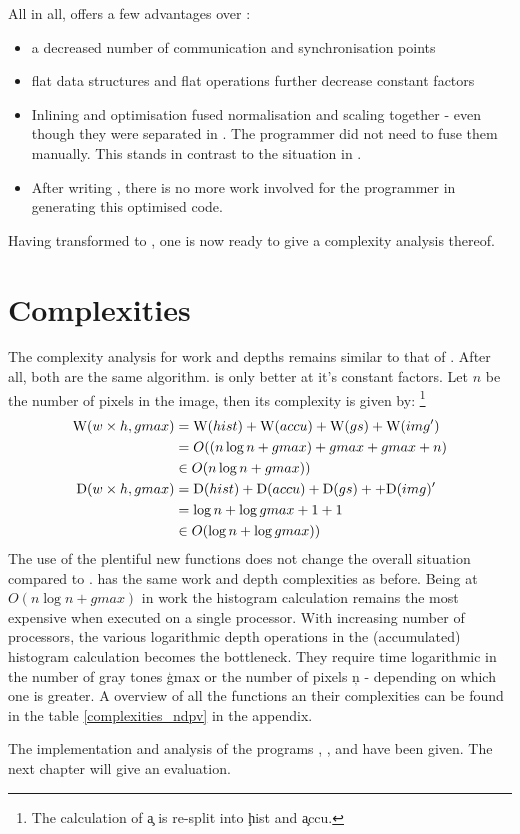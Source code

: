   All in all, \ndpv offers a few advantages over \ndpn:
  \begin{itemize}
    \item a decreased number of communication and synchronisation points
    \item flat data structures and flat operations further decrease constant factors
    \item Inlining and optimisation fused
          normalisation and scaling together - even though
          they were separated in \ndpn. The programmer did not
          need to fuse them manually. This stands in contrast to the situation in \man.
    \item After writing \ndpn, there is no more work involved for the programmer in generating this optimised code.
  \end{itemize}
  Having transformed \ndpn to \ndpv,
  one is now ready to give a complexity analysis thereof.
  
\section{Complexities}
  The complexity analysis for work and depths remains similar to that of \ndpn.
  After all, both are the same algorithm. \ndpv is only better at it's constant factors.
  Let $n$ be the number of pixels in the image,
  then its complexity is given by:
  \footnote{
  The calculation of \c{a} is re-split into \c{hist} and \c{accu}.
  }
  \begin{equation*}
  \begin{split}
  \W(w \times h,gmax)
        & = \W(hist) + \W(accu) + \W(gs) + \comment{\W(expandPS) +} \W(img') \\
        & = O( (n \log n + gmax) + gmax + gmax \comment{ + 1} + n) \\
        & \in O(n \log n + gmax)) \\
  \D(w \times h,gmax)
      & = \D(hist) + \D(accu) + \D(gs) + \comment{+ \D(expandPS)} + \D(img)' \\
      & = \log n + \log gmax + 1 + 1  \\
      & \in O(\log n + \log gmax)) \\
  \end{split}
  \end{equation*}
  The use of the plentiful new functions does not change the overall situation compared to \ndpn.
  \ndpv has the same work and depth complexities as before.
  Being at $O(n \log n + gmax)$ in work
  the histogram calculation remains the most expensive when executed on a single processor.
  With increasing number of processors, the various logarithmic depth
  operations in the (accumulated) histogram calculation becomes the bottleneck.
  They require time logarithmic in the number of gray tones \c{gmax} or the number
  of pixels \c{n} - depending on which one is greater.
  A overview of all the functions an their complexities can be found in the table \ref{complexities_ndpv} in the appendix.
  
  
  The implementation and analysis of the programs \seq, \man, \ndpn and \ndpv
  have been given. The next chapter will give an evaluation.

